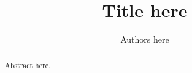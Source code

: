 \documentclass[times, 10pt, twocolumn]{article}
\begin{document}
\title{Title here}

\author{Authors here}

\maketitle

\begin{abstract}
Abstract here.
\end{abstract}











\end{document}
